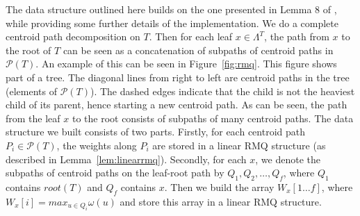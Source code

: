 \documentclass[final,1p,times]{elsarticle}
\newcommand{\leafset}{\Lambda}
\newcommand{\weight}{\omega}
\begin{document}
    The data structure outlined here builds on the one presented in Lemma 8 of \cite{jansson2018algorithms}, while providing some further details of the implementation. We do a complete centroid path decomposition on $T$. Then for each leaf $x \in \leafset^T$, the path from $x$ to the root of $T$ can be seen as a concatenation of subpaths of centroid paths in $\mathcal{P}(T)$. An example of this can be seen in Figure~\ref{fig:rmq}. This figure shows part of a tree. The diagonal lines from right to left are centroid paths in the tree (elements of $\mathcal{P}(T)$). The dashed edges indicate that the child is not the heaviest child of its parent, hence starting a new centroid path. As can be seen, the path from the leaf $x$ to the root consists of subpaths of many centroid paths. The data structure we built consists of two parts. Firstly, for each centroid path $P_i \in \mathcal{P}(T)$, the weights along $P_i$ are stored in a linear RMQ structure (as described in Lemma~\ref{lem:linearrmq}). Secondly, for each $x$, we denote the subpaths of centroid paths on the leaf-root path by $Q_1, Q_2, \ldots, Q_f$, where $Q_1$ contains $root(T)$ and $Q_f$ contains $x$. Then we build the array $W_x[1 \ldots f]$, where $W_x[i] = max_{u \in Q_i} \weight(u)$ and store this array in a linear RMQ structure.
    \newline
\end{document}
